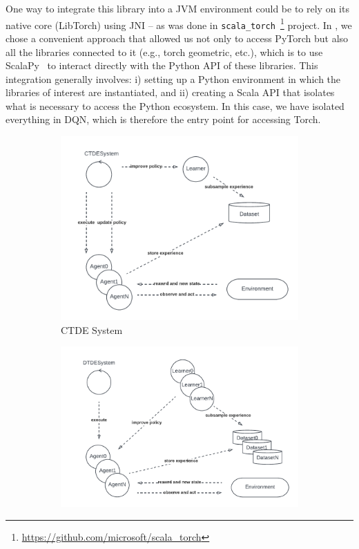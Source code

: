 %
One way to integrate this library into a JVM environment could be 
 to rely on its native core (LibTorch) using JNI -- 
 as was done in \texttt{scala\_torch}~\footnote{\url{https://github.com/microsoft/scala_torch}} project. 
 In \scarlib{}, we chose a convenient approach 
 that allowed us not only to access PyTorch 
 but also all the libraries connected to it 
 (e.g., torch geometric, etc.), 
 which is to use ScalaPy~\cite{Laddad2020}  to interact directly with the Python API 
 of these libraries.
%
This integration generally involves:
i) setting up a Python environment in which the libraries of interest are instantiated, and
ii) creating a Scala API that isolates what is necessary to access the Python ecosystem.
In this case, we have isolated everything in DQN, which is therefore the entry point for accessing Torch.
\begin{figure}[t]
    \centering
    \begin{subfigure}[b]{0.49\textwidth}
        \centering
        \includegraphics[width=\textwidth]{papers/coordination2023/imgs/ctdesystem.pdf}
        \caption{CTDE System}
        \label{coordination2023:fig:ctde}
    \end{subfigure}
    \begin{subfigure}[b]{0.49\textwidth}
        \centering
        \includegraphics[width=\textwidth]{papers/coordination2023/imgs/DTDE.pdf}

\end{subfigure}
\end{figure}
